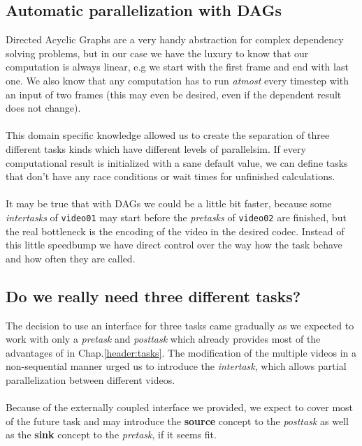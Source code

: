 \documentclass[titlepage]{article}
\begin{document}
\subsection{Automatic parallelization with DAGs}

Directed Acyclic Graphs are a very handy abstraction for complex dependency solving problems, but in our case we have the luxury to know that our computation is always linear, e.g we start with the first frame and end with last one. We also know that any computation has to run \textit{atmost} every timestep with an input of two frames (this may even be desired, even if the dependent result does not change).\\
\hfill \\
This domain specific knowledge allowed us to create the separation of three different tasks kinds which have different levels of parallelsim. If every computational result is initialized with a sane default value, we can define tasks that don't have any race conditions or wait times for unfinished calculations.\\
\hfill \\
It may be true that with DAGs we could be a little bit faster, because some \textit{intertasks} of \texttt{video01} may start before the \textit{pretasks} of \texttt{video02} are finished, but the real bottleneck is the encoding of the video in the desired codec. Instead of this little speedbump we have direct control over the way how the task behave and how often they are called.\\

\subsection{Do we really need three different tasks?}

The decision to use an interface for three tasks came gradually as we expected to work with only a \textit{pretask} and \textit{posttask} which already provides most of the advantages of in Chap.\ref{header:tasks}. The modification of the multiple videos in a non-sequential manner urged us to introduce the \textit{intertask}, which allows partial parallelization between different videos.\\
\hfill\\
Because of the externally coupled interface we provided, we expect to cover most of the future task and may introduce the \textbf{source} concept to the \textit{posttask} as well as the \textbf{sink} concept to the \textit{pretask}, if it seems fit. 
\end{document}
